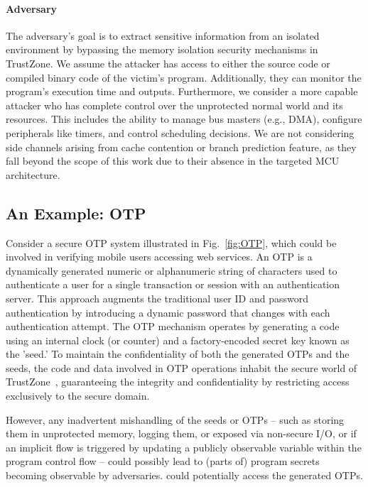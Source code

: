 \paragraph{\textbf{Adversary}} The adversary’s goal is to extract
sensitive information from an isolated environment by bypassing the memory
isolation security mechanisms in TrustZone. We assume the attacker has
access to either the source code or compiled binary code of the victim's
program. Additionally, they can monitor the program's execution time and
outputs. Furthermore, we consider a more capable attacker who has complete
control over the unprotected normal world and its resources. This includes
the ability to manage bus masters (e.g., DMA), configure peripherals like
timers, and control scheduling decisions. We are not considering side
channels arising from cache contention or branch prediction feature, as
they fall beyond the scope of this work due to their absence in the
targeted MCU architecture.


\subsection{An Example: OTP}

Consider a secure \ac{OTP} system illustrated in
Fig.~\ref{fig:OTP}, which could be involved in verifying mobile users
accessing web services. An \ac{OTP} is a dynamically generated numeric or
alphanumeric string of characters used to authenticate a user for a single
transaction or session with an authentication server. This approach
augments the traditional user ID and password authentication by introducing
a dynamic password that changes with each authentication attempt. The
\ac{OTP} mechanism operates by generating a code using an internal clock
(or counter) and a factory-encoded secret key known as the 'seed.' To
maintain the confidentiality of both the generated \acp{OTP} and the seeds,
the code and data involved in \ac{OTP} operations inhabit the secure world
of TrustZone~\cite{trustotp}, guaranteeing the integrity and
confidentiality by restricting access exclusively to the secure domain.

However, any inadvertent mishandling of the seeds or \acp{OTP} -- such as
storing them in unprotected memory, logging them, or exposed
via non-secure I/O, or if an implicit flow is triggered by updating a
publicly observable variable within the program control flow -- could
possibly lead to (parts of) program secrets becoming observable by
adversaries.  could potentially access the generated \acp{OTP}.

